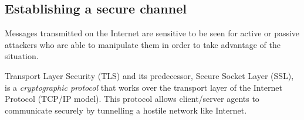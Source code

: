 \subsection{Establishing a secure channel}
\label{sec:secureChannel}
Messages transmitted on the Internet are sensitive to be seen for
active or passive attackers who are able to manipulate them in order
to take advantage of the situation.

Transport Layer Security (TLS) and its predecessor, Secure Socket
Layer (SSL), is a \emph{cryptographic protocol} that works over the transport 
layer of the Internet Protocol (TCP/IP model). This protocol allows client/server 
agents to communicate securely by tunnelling a hostile network like Internet. 


